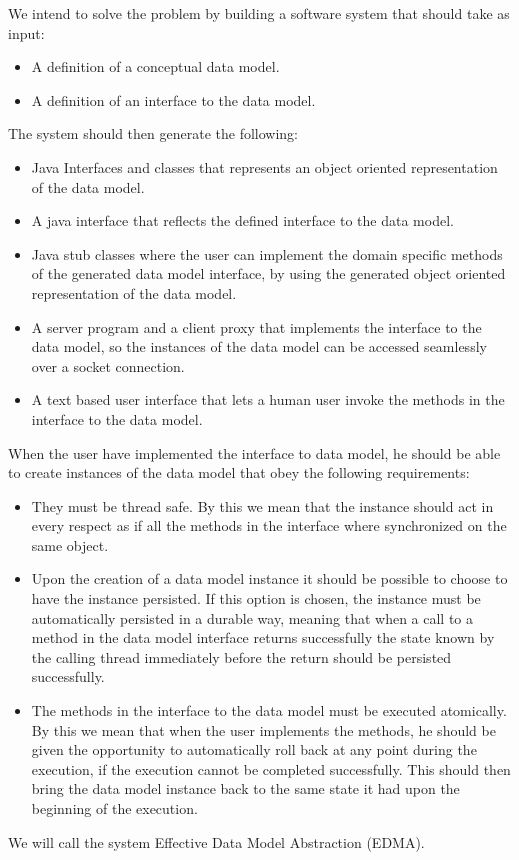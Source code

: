 We intend to solve the problem by building a software system that
should take as input:
\begin{itemize}
\item A definition of a conceptual data model.
\item A definition of an interface to the data model.
\end{itemize}
The system should then generate the following:
\begin{itemize}
\item Java Interfaces and classes that represents an object oriented representation
of the data model.
\item A java interface that reflects the defined interface to the data model.
\item Java stub classes where the user can implement the domain specific
methods of the generated data model interface, by using the generated
object oriented representation of the data model.
\item A server program and a client proxy that implements the interface
to the data model, so the instances of the data model can be accessed
seamlessly over a socket connection.
\item A text based user interface that lets a human user invoke the methods
in the interface to the data model.
\end{itemize}
When the user have implemented the interface to data model, he should
be able to create instances of the data model that obey the following
requirements:
\begin{itemize}
\item They must be thread safe. By this we mean that the instance should
act in every respect as if all the methods in the interface where
synchronized on the same object.
\item Upon the creation of a data model instance it should be possible to
choose to have the instance persisted. If this option is chosen, the
instance must be automatically persisted in a durable way, meaning
that when a call to a method in the data model interface returns successfully
the state known by the calling thread immediately before the return
should be persisted successfully.
\item The methods in the interface to the data model must be executed atomically.
By this we mean that when the user implements the methods, he should
be given the opportunity to automatically roll back at any point during
the execution, if the execution cannot be completed successfully.
This should then bring the data model instance back to the same state
it had upon the beginning of the execution.
\end{itemize}
We will call the system Effective Data Model Abstraction (EDMA).

